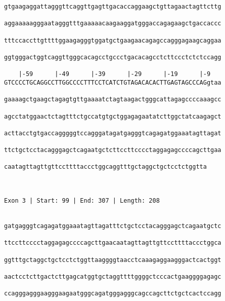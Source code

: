\documentclass{article}
\begin{document}
\begin{Verbatim}
gtgaagaggattagggttcaggttgagttgacaccaggaagctgttagaactagttcttg
                                                            
aggaaaaagggaatagggtttgaaaaacaagaaggatgggaccagagaagctgaccaccc
                                                            
tttccaccttgttttggaagagggtggatgctgaagaacagagccagggagaagcaggaa
                                                            
ggtgggactggtcaggttgggcacagcctgccctgacacagcctcttccctctctccagg
                                                            
    |-59      |-49      |-39      |-29      |-19      |-9   
GTCCCCTGCAGGCCTTGGCCCCTTTCCTCATCTGTAGACACACTTGAGTAGCCCAGgtaa
                                                            
gaaaagctgaagctagagtgttgaaaatctagtaagactgggcattagagccccaaagcc
                                                            
agcctatggaactctagtttctgccatgtgctggagagaatatcttggctatcaagagct
                                                            
acttacctgtgaccagggggtccagggatagatgagggtcagagatggaaatagttagat
                                                            
ttctgctcctacagggagctcagaatgctcttccttcccctaggagagccccagcttgaa
                                                            
caatagttagttgttccttttaccctggcaggtttgctaggctgctcctctggtta
                                                        
                                                        
 
Exon 3 | Start: 99 | End: 307 | Length: 208


gatgagggtcagagatggaaatagttagatttctgctcctacagggagctcagaatgctc
                                                            
ttccttcccctaggagagccccagcttgaacaatagttagttgttccttttaccctggca
                                                            
ggtttgctaggctgctcctctggttaaggggtaacctcaaagaggaagggactcactggt
                                                            
aactcctcttgactcttgagcatggtgctaggttttggggctcccactgaaggggagagc
                                                            
ccagggagggaagggaagaatgggcagatgggagggcagccagcttctgctcactccagg
                                                            

\end{Verbatim}
\end{document}
